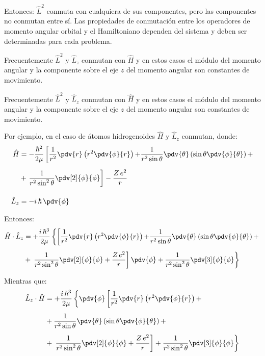 Entonces: $\hat{L}^{2}$ conmuta con cualquiera de sus componentes, pero las componentes no conmutan entre sí. Las propiedades de conmutación entre los operadores de momento angular orbital y el Hamiltoniano dependen del sistema y deben ser determinadas para cada problema.
\par
Frecuentemente $\hat{L}^{2}$ y $\hat{L}_{z}$ conmutan con $\hat{H}$ y en estos casos el módulo del momento angular y la componente sobre el eje $z$ del momento angular son constantes de movimiento.
\par
Frecuentemente $\hat{L}^{2}$ y $\hat{L}_{z}$ conmutan con $\hat{H}$ y en estos casos el módulo del momento angular y la componente sobre el eje $z$ del momento angular son constantes de movimiento.
\par
Por ejemplo, en el caso de átomos hidrogenoides $\hat{H}$ y $\hat{L}_{z}$ conmutan, donde:
\begin{align*}
\hat{H} &= - \dfrac{\hbar^{2}}{2 \mu} \left[ \dfrac{1}{r^{2}} \pdv{r} \left( r^{2} \pdv{\phi}{r} \right) {+} \dfrac{1}{r^{2} \sin \theta} \pdv{\theta} \left( \sin \theta \pdv{\phi}{\theta} \right) {+} \right. \\[0.5em]
&+ \left. \dfrac{1}{r^{2} \sin^{2} \theta} \pdv[2]{\phi}{\phi} \right] - \dfrac{Z \, e^{2}}{r} \\[1em]
\hat{L}_{z} &= - i \, \hbar \, \pdv{\phi}
\end{align*}

Entonces:
\begin{align*}
\hat{H} \cdot \hat{L}_{z} &= + \dfrac{i \, \hbar^{3}}{2 \mu} \left\{ \left[ \dfrac{1}{r^{2}} \pdv{r} \left( r^{2} \pdv{\phi}{r} \right) {+} \dfrac{1}{r^{2} \sin \theta} \pdv{\theta} \left( \sin \theta \pdv{\phi}{\theta} \right) {+} \right. \right. \\[0.5em]
&+ \left. \left. \dfrac{1}{r^{2} \sin^{2} \theta} \pdv[2]{\phi}{\phi} + \dfrac{Z \, e^{2}}{r} \right] \pdv{\phi} + \dfrac{1}{r^{2} \sin^{2} \theta} \pdv[3]{\phi}{\phi} \right\}
\end{align*}

Mientras que:
\begin{align*}
\hat{L}_{z} \cdot \hat{H}  &= + \dfrac{i \, \hbar^{3}}{2 \mu} \left\{ \pdv{\phi} \left[ \dfrac{1}{r^{2}} \pdv{r} \left( r^{2} \pdv{\phi}{r} \right) {+} \right. \right. \\[0.5em]
&+ \dfrac{1}{r^{2} \sin \theta} \pdv{\theta} \left( \sin \theta \pdv{\phi}{\theta} \right) {+} \\[0.5em]
&+ \left. \left. \dfrac{1}{r^{2} \sin^{2} \theta} \pdv[2]{\phi}{\phi} + \dfrac{Z \, e^{2}}{r} \right] + \dfrac{1}{r^{2} \sin^{2} \theta} \pdv[3]{\phi}{\phi} \right\}
\end{align*}

